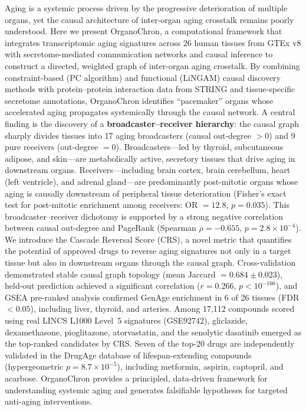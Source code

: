 \documentclass[11pt,a4paper]{article}
\begin{document}
Aging is a systemic process driven by the progressive deterioration of multiple organs, yet the causal architecture of inter-organ aging crosstalk remains poorly understood. Here we present OrganoChron, a computational framework that integrates transcriptomic aging signatures across 26 human tissues from GTEx v8 with secretome-mediated communication networks and causal inference to construct a directed, weighted graph of inter-organ aging crosstalk. By combining constraint-based (PC algorithm) and functional (LiNGAM) causal discovery methods with protein--protein interaction data from STRING and tissue-specific secretome annotations, OrganoChron identifies ``pacemaker'' organs whose accelerated aging propagates systemically through the causal network. A central finding is the discovery of a \textbf{broadcaster--receiver hierarchy}: the causal graph sharply divides tissues into 17 aging broadcasters (causal out-degree $> 0$) and 9 pure receivers (out-degree $= 0$). Broadcasters---led by thyroid, subcutaneous adipose, and skin---are metabolically active, secretory tissues that drive aging in downstream organs. Receivers---including brain cortex, brain cerebellum, heart (left ventricle), and adrenal gland---are predominantly post-mitotic organs whose aging is causally downstream of peripheral tissue deterioration (Fisher's exact test for post-mitotic enrichment among receivers: OR $= 12.8$, $p = 0.035$). This broadcaster--receiver dichotomy is supported by a strong negative correlation between causal out-degree and PageRank (Spearman $\rho = -0.655$, $p = 2.8 \times 10^{-4}$). We introduce the Cascade Reversal Score (CRS), a novel metric that quantifies the potential of approved drugs to reverse aging signatures not only in a target tissue but also in downstream organs through the causal graph. Cross-validation demonstrated stable causal graph topology (mean Jaccard $= 0.684 \pm 0.023$), held-out prediction achieved a significant correlation ($r = 0.266$, $p < 10^{-166}$), and GSEA pre-ranked analysis confirmed GenAge enrichment in 6 of 26 tissues (FDR $< 0.05$), including liver, thyroid, and arteries. Among 17,112 compounds scored using real LINCS L1000 Level~5 signatures (GSE92742), gliclazide, dexamethasone, pioglitazone, atorvastatin, and the senolytic dasatinib emerged as the top-ranked candidates by CRS. Seven of the top-20 drugs are independently validated in the DrugAge database of lifespan-extending compounds (hypergeometric $p = 8.7 \times 10^{-5}$), including metformin, aspirin, captopril, and acarbose. OrganoChron provides a principled, data-driven framework for understanding systemic aging and generates falsifiable hypotheses for targeted anti-aging interventions.
\end{document}
